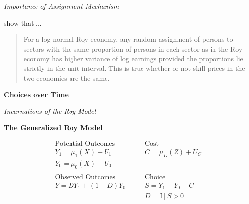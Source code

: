 \begin{frame}\begin{center}
\LARGE\textit{Importance of Assignment Mechanism}
\end{center}\end{frame}

\begin{frame}

\citet{Heckman.1990} show that ... \vspace{0.5cm}

\begin{quote} For a log normal Roy economy, any random assignment of persons to sectors with the same proportion of persons in each sector as in the Roy economy has higher variance of log earnings provided the proportions lie strictly in the unit interval. This is true whether or not skill prices in the two economies are the same.
\end{quote}
\end{frame}

\begin{frame}
\begin{center} \textbf{Choices over Time}\\\vspace{0.5cm}
\end{center}
\end{frame}

\begin{frame}\begin{center}
\LARGE\textit{Incarnations of the Roy Model}
\end{center}\end{frame}
\begin{frame}
\textbf{The Generalized Roy Model}

\begin{align*}
\text{Potential Outcomes} &\qquad \text{Cost} \\
Y_1 = \mu_1(X) + U_1      &\qquad C = \mu_D(Z) + U_C \\
Y_0 = \mu_0(X) + U_0      &\qquad \\
    & \\
\text{Observed Outcomes } &\qquad \text{Choice} \\
Y = D Y_1 + (1 - D)Y_0 &\qquad S = Y_1 - Y_0 - C \\
                       &\qquad D = \mathrm{I}[S > 0] \\
\end{align*}
\end{frame}

